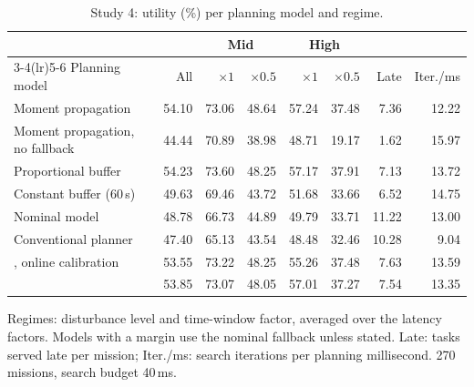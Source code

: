\begin{table}[t]
\caption{Study 4: utility (\%) per planning model and regime.}\label{tab:s4}
\centering\small
\begin{threeparttable}
\begin{tabular}{lrrrrrrr}
\toprule
& & \multicolumn{2}{c}{Mid} & \multicolumn{2}{c}{High} & & \\
\cmidrule(lr){3-4}\cmidrule(lr){5-6}
Planning model & All & $\times 1$ & $\times 0.5$ & $\times 1$ & $\times 0.5$ & Late & Iter./ms \\
\midrule
Moment propagation & 54.10 & 73.06 & 48.64 & 57.24 & 37.48 & 7.36 & 12.22 \\
Moment propagation, no fallback & 44.44 & 70.89 & 38.98 & 48.71 & 19.17 & 1.62 & 15.97 \\
Proportional buffer & 54.23 & 73.60 & 48.25 & 57.17 & 37.91 & 7.13 & 13.72 \\
Constant buffer (60\,s) & 49.63 & 69.46 & 43.72 & 51.68 & 33.66 & 6.52 & 14.75 \\
Nominal model & 48.78 & 66.73 & 44.89 & 49.79 & 33.71 & 11.22 & 13.00 \\
Conventional planner & 47.40 & 65.13 & 43.54 & 48.48 & 32.46 & 10.28 & 9.04 \\
\mname{}, online calibration & 53.55 & 73.22 & 48.25 & 55.26 & 37.48 & 7.63 & 13.59 \\
\mname{} & 53.85 & 73.07 & 48.05 & 57.01 & 37.27 & 7.54 & 13.35 \\
\bottomrule
\end{tabular}
\begin{tablenotes}[flushleft]\scriptsize
\item[] Regimes: disturbance level and time-window factor, averaged over the latency factors. Models with a margin use the nominal fallback unless stated. Late: tasks served late per mission; Iter./ms: search iterations per planning millisecond. 270 missions, search budget 40\,ms.
\end{tablenotes}
\end{threeparttable}
\end{table}

